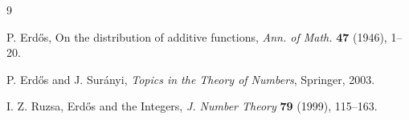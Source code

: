 \documentclass[12pt,a4paper]{amsart}
\theoremstyle{remark}
\begin{document}
\begin{thebibliography}{9}

{P. Erd\H{o}s},
On the distribution of additive functions,
\textit{Ann. of Math.} \textbf{47} (1946), 1--20.

{P. Erd\H{o}s and J. Sur\'anyi},
\textit{Topics in the Theory of Numbers},
Springer, 2003.

{I. Z. Ruzsa},
Erd\H{o}s and the Integers,
\textit{J. Number Theory} \textbf{79} (1999), 115--163.

\end{thebibliography}

\end{document}

